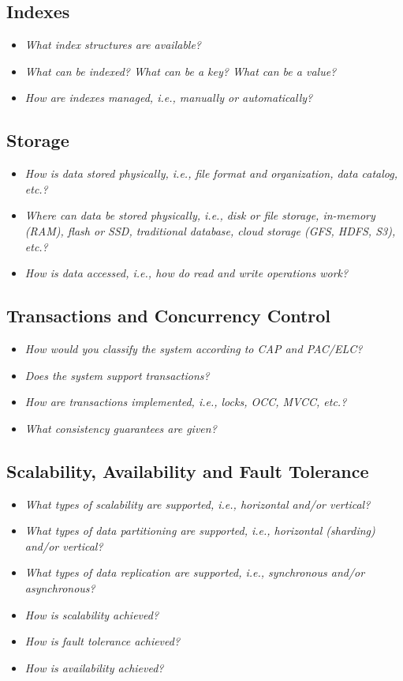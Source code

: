 \subsection{Indexes}
\begin{itemize}
\item \emph{What index structures are available?}
\item \emph{What can be indexed? What can be a key? What can be a value?}
\item \emph{How are indexes managed, i.e., manually or automatically?}
\end{itemize}

\subsection{Storage}
\begin{itemize}
\item \emph{How is data stored physically, i.e., file format and organization, data catalog, etc.?}
\item \emph{Where can data be stored physically, i.e., disk or file storage, in-memory (RAM), flash or SSD, traditional database, cloud storage (GFS, HDFS, S3), etc.?}
\item \emph{How is data accessed, i.e., how do read and write operations work?}
\end{itemize}

\subsection{Transactions and Concurrency Control}
\begin{itemize}
\item \emph{How would you classify the system according to CAP and PAC/ELC?}
\item \emph{Does the system support transactions?}
\item \emph{How are transactions implemented, i.e., locks, OCC, MVCC, etc.?}
\item \emph{What consistency guarantees are given?}
\end{itemize}

\subsection{Scalability, Availability and Fault Tolerance}
\begin{itemize}
\item \emph{What types of scalability are supported, i.e., horizontal and/or vertical?}
\item \emph{What types of data partitioning are supported, i.e., horizontal (sharding) and/or vertical?}
\item \emph{What types of data replication are supported, i.e., synchronous and/or asynchronous?}
\item \emph{How is scalability achieved?}
\item \emph{How is fault tolerance achieved?}
\item \emph{How is availability achieved?}
\end{itemize}

